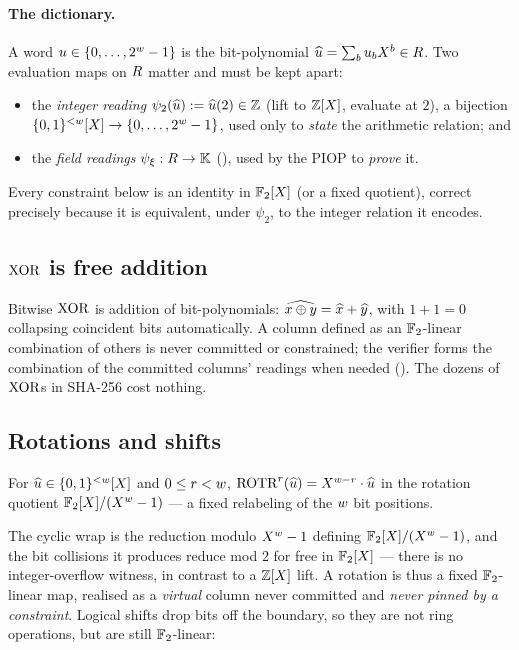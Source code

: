 \paragraph{The dictionary.} A word $u\in\{0,\dots,2^{w}-1\}$ is the
bit-polynomial $\widehat{u} = \sum_b u_b X^b\in R$. Two evaluation maps on
$R$ matter and must be kept apart:
\begin{itemize}[leftmargin=2em]
  \item the \emph{integer reading} $\psi_2(\widehat{u}) := \widehat{u}(2)\in\mathbb{Z}$ (lift to
    $\mathbb{Z}[X]$, evaluate at $2$), a bijection
    $\{0,1\}^{<w}[X]\to\{0,\dots,2^{w}-1\}$, used only to \emph{state} the
    arithmetic relation; and
  \item the \emph{field readings} $\psi_\xi:R\to\mathbb{K}$
    (), used by the PIOP to \emph{prove} it.
\end{itemize}
Every constraint below is an identity in $\mathbb{F}_2[X]$ (or a fixed quotient),
correct precisely because it is equivalent, under $\psi_2$, to the integer
relation it encodes.

\subsection{$\operatorname{XOR}$ is free addition}
\label{sec:xor}

Bitwise $\operatorname{XOR}$ is addition of bit-polynomials: $\widehat{x\oplus y} =
\widehat{x}+\widehat{y}$, with $1+1 = 0$ collapsing coincident bits automatically. A
column defined as an $\mathbb{F}_2$-linear combination of others is never committed or
constrained; the verifier forms the combination of the committed columns'
readings when needed (). The dozens of $\operatorname{XOR}$s in
SHA-256 cost nothing.

\subsection{Rotations and shifts}
\label{sec:rot-shift}

\begin{lemma}
\label{lem:rot}
For $\widehat{u}\in\{0,1\}^{<w}[X]$ and $0\le r<w$,
$\operatorname{ROTR}^{r}(\widehat{u}) = X^{w-r}\cdot\widehat{u}$ in the rotation quotient $\mathbb{F}_2[X]/(X^{w}-1)$ ---
a fixed relabeling of the $w$ bit positions.
\end{lemma}

The cyclic wrap is the reduction modulo $X^{w}-1$ defining $\mathbb{F}_2[X]/(X^{w}-1)$, and the
bit collisions it produces reduce mod $2$ for free in $\mathbb{F}_2[X]$ --- there is no
integer-overflow witness, in contrast to a $\mathbb{Z}[X]$ lift. A rotation is thus a
fixed $\mathbb{F}_2$-linear map, realised as a \emph{virtual} column never committed
and \emph{never pinned by a constraint}. Logical shifts drop bits off the
boundary, so they are not ring operations, but are still $\mathbb{F}_2$-linear:

